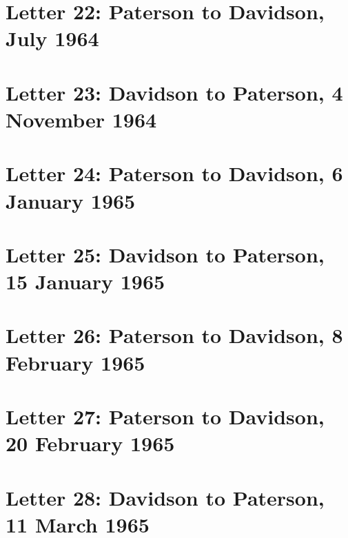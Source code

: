 \documentclass[a4paper,11pt,abstracton,hidelinks]{scrartcl}
\begin{document}
\section{Letter 22: Paterson to Davidson, July 1964}


\section{Letter 23: Davidson to Paterson, 4 November 1964}


\section{Letter 24: Paterson to Davidson, 6 January 1965}


\section{Letter 25: Davidson to Paterson, 15 January 1965}


\section{Letter 26: Paterson to Davidson, 8 February 1965}


\section{Letter 27: Paterson to Davidson, 20 February 1965}


\section{Letter 28: Davidson to Paterson, 11 March 1965}

\end{document}
